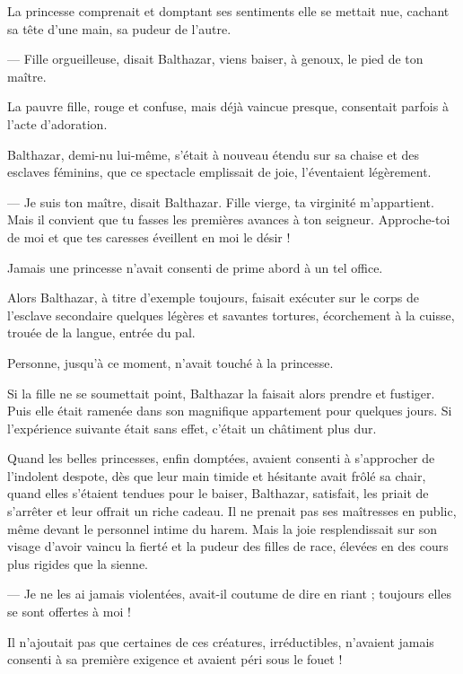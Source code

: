 \documentclass[a4paper, 11pt, oneside, polutonikogreek, french]{article}
\begin{document}
La princesse comprenait et domptant ses sentiments elle se mettait nue, cachant sa tête d'une main, sa pudeur de l'autre.

--- Fille orgueilleuse, disait Balthazar, viens baiser, à genoux, le pied de ton maître.

La pauvre fille, rouge et confuse, mais déjà vaincue presque, consentait parfois à l'acte d'adoration.

Balthazar, demi-nu lui-même, s'était à nouveau étendu sur sa chaise et des esclaves féminins, que ce spectacle emplissait de joie, l'éventaient légèrement.

--- Je suis ton maître, disait Balthazar. Fille vierge, ta virginité m'appartient. Mais il convient que tu fasses les premières avances à ton seigneur. Approche-toi de moi et que tes caresses éveillent en moi le désir !

Jamais une princesse n'avait consenti de prime abord à un tel office.

Alors Balthazar, à titre d'exemple toujours, faisait exécuter sur le corps de l'esclave secondaire quelques légères et savantes tortures, écorchement à la cuisse, trouée de la langue, entrée du pal.

Personne, jusqu'à ce moment, n'avait touché à la princesse.

Si la fille ne se soumettait point, Balthazar la faisait alors prendre et fustiger. Puis elle était ramenée dans son magnifique appartement pour quelques jours. Si l'expérience suivante était sans effet, c'était un châtiment plus dur.

Quand les belles princesses, enfin domptées, avaient consenti à s'approcher de l'indolent despote, dès que leur main timide et hésitante avait frôlé sa chair, quand elles s'étaient tendues pour le baiser, Balthazar, satisfait, les priait de s'arrêter et leur offrait un riche cadeau. Il ne prenait pas ses maîtresses en public, même devant le personnel intime du harem. Mais la joie resplendissait sur son visage d'avoir vaincu la fierté et la pudeur des filles de race, élevées en des cours plus rigides que la sienne.

--- Je ne les ai jamais violentées, avait-il coutume de dire en riant ; toujours elles se sont offertes à moi !

Il n'ajoutait pas que certaines de ces créatures, irréductibles, n'avaient jamais consenti à sa première exigence et avaient péri sous le fouet !

\bigskip
\centerline{\EightStarTaper}
\centerline{\EightStarTaper\EightStarTaper}
\bigskip
\end{document}
